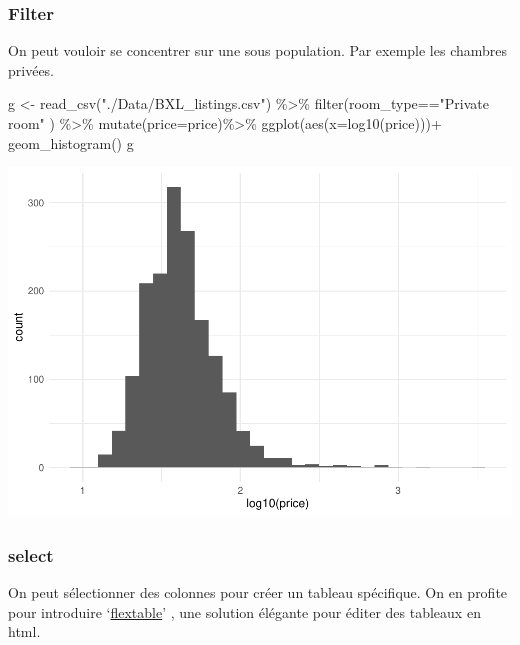 \documentclass[
]{book}
\newenvironment{Shaded}{\begin{snugshade}}{\end{snugshade}}
\newcommand{\AttributeTok}[1]{\textcolor[rgb]{0.77,0.63,0.00}{#1}}
\newcommand{\FunctionTok}[1]{\textcolor[rgb]{0.00,0.00,0.00}{#1}}
\newcommand{\NormalTok}[1]{#1}
\newcommand{\OtherTok}[1]{\textcolor[rgb]{0.56,0.35,0.01}{#1}}
\newcommand{\SpecialCharTok}[1]{\textcolor[rgb]{0.00,0.00,0.00}{#1}}
\newcommand{\StringTok}[1]{\textcolor[rgb]{0.31,0.60,0.02}{#1}}
\begin{document}
\hypertarget{filter}{%
\subsubsection{Filter}\label{filter}}

On peut vouloir se concentrer sur une sous population. Par exemple les chambres privées.

\begin{Shaded}
\begin{Highlighting}[]
\NormalTok{g }\OtherTok{\textless{}{-}} \FunctionTok{read\_csv}\NormalTok{(}\StringTok{"./Data/BXL\_listings.csv"}\NormalTok{) }\SpecialCharTok{\%\textgreater{}\%} 
  \FunctionTok{filter}\NormalTok{(room\_type}\SpecialCharTok{==}\StringTok{"Private room"}\NormalTok{ ) }\SpecialCharTok{\%\textgreater{}\%} 
    \FunctionTok{mutate}\NormalTok{(}\AttributeTok{price=}\NormalTok{price)}\SpecialCharTok{\%\textgreater{}\%}
  \FunctionTok{ggplot}\NormalTok{(}\FunctionTok{aes}\NormalTok{(}\AttributeTok{x=}\FunctionTok{log10}\NormalTok{(price)))}\SpecialCharTok{+}
  \FunctionTok{geom\_histogram}\NormalTok{()}
\NormalTok{g}
\end{Highlighting}
\end{Shaded}

\includegraphics{bookdown-demo_files/figure-latex/0205-1.pdf}

\hypertarget{select}{%
\subsubsection{select}\label{select}}

On peut sélectionner des colonnes pour créer un tableau spécifique. On en profite pour introduire `\href{https://ardata-fr.github.io/flextable-book/index.html}{flextable}' , une solution élégante pour éditer des tableaux en html.
\end{document}
